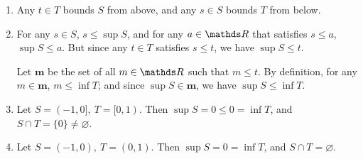 \documentclass{homework}
\begin{document}
\begin{solution}
  \begin{enumerate}[label=(\alph*)]
    \item Any $t\in T$ bounds $S$ from above, and any $s \in S$ bounds $T$ from below.
    \item For any $s \in S$, $s\le \sup{S}$, and for any $a\in \R$ that satisfies $s\le a$,
      $\sup{S}\le a$. But since any $t\in T$ satisfies $s\le t$, we have $\sup{S}\le t$.

      Let $\textbf{m}$ be the set of all $m\in \R$ such that $m\le t$. By definition, for any $m\in
      \textbf{m}$, $m\le \inf{T}$; and since $\sup{S}\in \textbf{m} $, we have $\sup{S}\le \inf{T}$.

    \item Let $S=(-1,0],\ T=[0,1)$. Then  $\sup{S}=0\le 0=\inf{T}$, and $S\cap T=\{ 0 \}\neq
      \varnothing$.
    \item Let $S=(-1,0),\ T=(0,1)$. Then  $\sup{S}=0=\inf{T}$, and $S\cap T=\varnothing$.
  \end{enumerate}
\end{solution}
\end{document}
